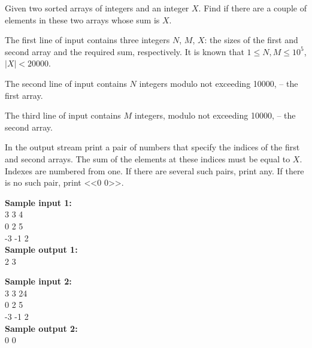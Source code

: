 \documentclass[a4paper]{article}
\begin{document}
Given two sorted arrays of integers and an integer $X$. Find if there are a couple of elements in these two arrays whose sum is $X$.

The first line of input contains three integers $N$, $M$, $X$: the sizes of the first and second array and the required sum, respectively. It is known that $1 \le N, M \le 10^5$, $|X| < 20000$.

The second line of input contains $N$ integers modulo not exceeding 10000, -- the first array.

The third line of input contains $M$ integers, modulo not exceeding 10000, -- the second array.

In the output stream print a pair of numbers that specify the indices of the first and second arrays. The sum of the elements at these indices must be equal to $X$. Indexes are numbered from one. If there are several such pairs, print any. If there is no such pair, print <<0 0>>.

\LINE

\noindent \textbf{Sample input 1:}\\
3 3 4\\
0 2 5\\
-3 -1 2\\


\noindent \textbf{Sample output 1:}\\
2 3


\SPACE

\noindent \textbf{Sample input 2:}\\
3 3 24\\
0 2 5\\
-3 -1 2\\


\noindent \textbf{Sample output 2:}\\
0 0
\end{document}
